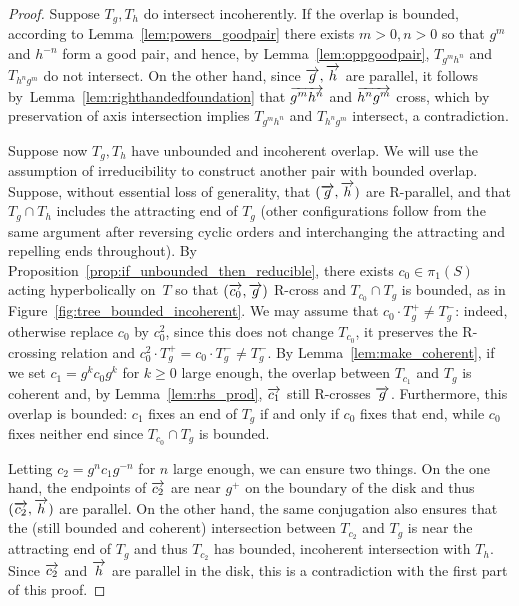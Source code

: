 \begin{proof}
  Suppose $T_g, T_h$ do intersect incoherently.
    If the overlap is bounded, according to
    Lemma~\ref{lem:powers_goodpair} there exists $m>0,n>0$ so that
    $g^m$ and $h^{-n}$ form a good pair, and hence, by
    Lemma~\ref{lem:oppgoodpair}, $T_{g^mh^n}$ and $T_{h^ng^m}$
    do not intersect. On the other hand, since $\overrightarrow{g},\overrightarrow{h}$ are
    parallel, it follows by~Lemma~\ref{lem:righthandedfoundation} that
    $\overrightarrow{g^mh^n}$ and $\overrightarrow{h^ng^m}$ cross, which by preservation of
    axis intersection implies $T_{g^mh^n}$ and $T_{h^ng^m}$  intersect, a
    contradiction.

    Suppose now $T_g,T_h$ have unbounded and incoherent overlap. We will use
    the assumption of irreducibility to construct another pair with
    bounded overlap. Suppose, without essential loss of generality,
    that $(\overrightarrow{g},\overrightarrow{h})$ are R-parallel,
    and that $T_g \cap T_h$ includes the attracting end of $T_g$ (other configurations follow from the same argument after reversing cyclic orders and interchanging the attracting and repelling ends throughout). By
    Proposition~\ref{prop:if_unbounded_then_reducible}, there exists
    $c_0 \in \pi_1(S)$ acting hyperbolically on~$T$ so that
    $(\overrightarrow{c_0},\overrightarrow{g})$ R-cross and
    $T_{c_0} \cap T_g$ is bounded, as in Figure~\ref{fig:tree_bounded_incoherent}.
    We may assume that $c_0 \cdot T_g^+ \neq T_g^-$: indeed, otherwise replace $c_0$ by $c_0^2$, since this does not change $T_{c_0}$, it preserves the R-crossing relation and $c_0^2 \cdot T_g^+ = c_0 \cdot T_g^- \neq T_g^-$.
    By
    Lemma~\ref{lem:make_coherent}, if we set $c_1=g^kc_0 g^k$ for
    $k \geq 0$ large enough, the overlap between $T_{c_1}$ and $T_g$
    is coherent and, by Lemma~\ref{lem:rhs_prod}, $\overrightarrow{c_1}$ still
    R-crosses $\overrightarrow{g}$. Furthermore, this overlap is bounded: $c_1$ fixes an end of $T_g$ if and only if $c_0$ fixes that end, while $c_0$ fixes neither end since $T_{c_0} \cap T_g$ is bounded.
    
    Letting $c_2=g^n c_1 g^{-n}$ for $n$ large
    enough, we can ensure two things. On the one hand, the endpoints of
    $\overrightarrow{c_2}$ are near $g^+$ on the boundary of the disk and thus
    $(\overrightarrow{c_2},\overrightarrow{h})$ are
    parallel. On the other hand, the same conjugation also ensures
    that the (still bounded and coherent) intersection between
    $T_{c_2}$ and $T_g$ is near the attracting end of $T_g$ and thus
    $T_{c_2}$ has bounded, incoherent intersection with $T_h$. Since
    $\overrightarrow{c_2}$ and $\overrightarrow{h}$ are parallel in the disk, this is a
    contradiction with the first
    part of this proof.
   \end{proof}

